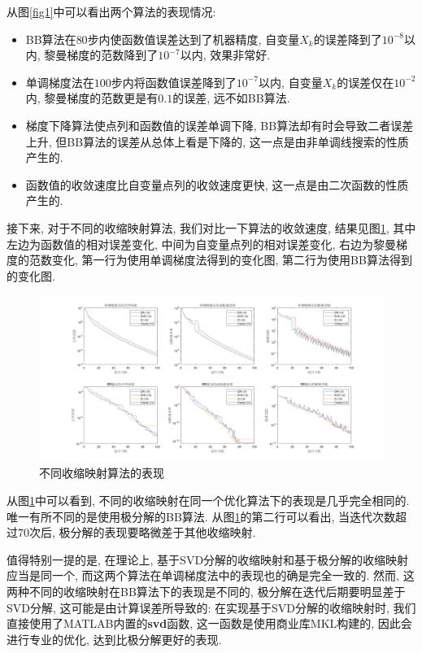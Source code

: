 \documentclass[UTF8]{ctexart}
\begin{document}
从图\ref{fig1}中可以看出两个算法的表现情况: 
\begin{itemize}
    \item BB算法在$80$步内使函数值误差达到了机器精度, 自变量$X_k$的误差降到了$10^{-8}$以内, 黎曼梯度的范数降到了$10^{-7}$以内, 效果非常好. 
    \item 单调梯度法在$100$步内将函数值误差降到了$10^{-7}$以内, 自变量$X_k$的误差仅在$10^{-2}$内, 黎曼梯度的范数更是有$0.1$的误差, 远不如BB算法. 
    \item 梯度下降算法使点列和函数值的误差单调下降, BB算法却有时会导致二者误差上升, 但BB算法的误差从总体上看是下降的, 这一点是由非单调线搜索的性质产生的. 
    \item 函数值的收敛速度比自变量点列的收敛速度更快, 这一点是由二次函数的性质产生的.
\end{itemize}

接下来, 对于不同的收缩映射算法, 我们对比一下算法的收敛速度, 结果见图\ref{fig2}, 其中左边为函数值的相对误差变化, 中间为自变量点列的相对误差变化, 右边为黎曼梯度的范数变化, 第一行为使用单调梯度法得到的变化图, 第二行为使用BB算法得到的变化图. 

\begin{figure}[htb]
    \centering
    \includegraphics[width=\textwidth]{Q2-figure/2.png}
    \caption{不同收缩映射算法的表现}\label{fig2}
\end{figure}

从图\ref{fig2}中可以看到, 不同的收缩映射在同一个优化算法下的表现是几乎完全相同的. 唯一有所不同的是使用极分解的BB算法. 从图\ref{fig2}的第二行可以看出, 当迭代次数超过$70$次后, 极分解的表现要略微差于其他收缩映射. 

值得特别一提的是, 在理论上, 基于SVD分解的收缩映射和基于极分解的收缩映射应当是同一个, 而这两个算法在单调梯度法中的表现也的确是完全一致的. 然而, 这两种不同的收缩映射在BB算法下的表现是不同的, 极分解在迭代后期要明显差于SVD分解, 这可能是由计算误差所导致的: 在实现基于SVD分解的收缩映射时, 我们直接使用了MATLAB内置的\textbf{svd}函数, 这一函数是使用商业库MKL构建的, 因此会进行专业的优化, 达到比极分解更好的表现. 
\end{document}
